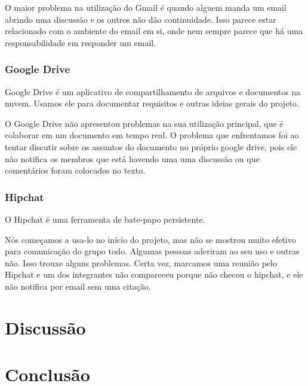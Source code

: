 \documentclass{acm_proc_article-sp}
\begin{document}
O maior problema na utilização do Gmail é quando alguem manda um email abrindo uma discussão e os outros não dão continuidade.
Isso parece estar relacionado com o ambiente do email em si, onde nem sempre parece que há uma responsabilidade em responder um email.

\subsubsection{Google Drive}
Google Drive é um aplicativo de compartilhamento de arquivos e documentos na nuvem. Usamos ele para documentar requisitos e outras ideias gerais do projeto.

O Google Drive não apresentou problemas na sua utilização principal, que é colaborar em um documento em tempo real.
O problema que enfrentamos foi ao tentar discutir sobre os assuntos do documento no próprio google drive, pois ele não
notifica os membros que está havendo uma uma discussão ou que comentários foram colocados no texto.

\subsubsection{Hipchat}
O Hipchat é uma ferramenta de bate-papo persistente.

Nós começamos a usa-lo no início do projeto, mas não se mostrou muito efetivo
para comunicação do grupo todo. Algumas pessoas aderiram ao seu uso e outras não. Isso trouxe alguns problemas.
Certa vez, marcamos uma reunião pelo Hipchat e um dos integrantes não compareceu porque não checou o hipchat, e ele não notifica por email
sem uma citação.

\section{Discussão}
%

\section{Conclusão}

%


\balancecolumns
\end{document}
